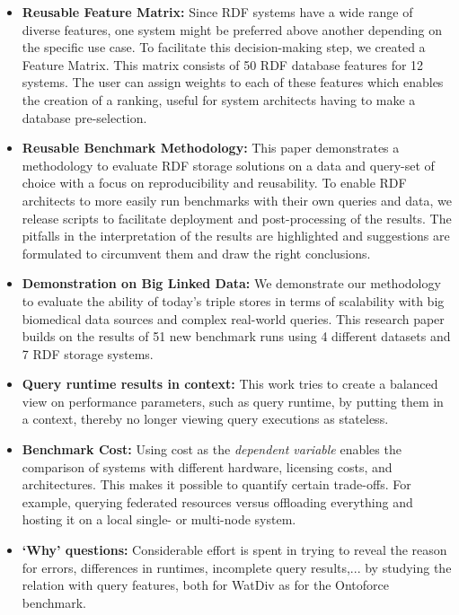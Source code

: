 \begin{itemize}
	\item \textbf{Reusable Feature Matrix:} Since RDF systems have a wide range of diverse features, one system might be preferred above another depending on the specific use case. To facilitate this decision-making step, we created a Feature Matrix. This matrix consists of 50 RDF database features for 12 systems.  The user can assign weights to each of these features which enables the creation of a ranking, useful for system architects having to make a database pre-selection.
	\item \textbf{Reusable Benchmark Methodology:} This paper demonstrates a methodology to evaluate RDF storage solutions on a data and query-set of choice with a focus on reproducibility and reusability. To enable RDF architects to more easily run benchmarks with their own queries and data, we release scripts to facilitate deployment and post-processing of the results. The pitfalls in the interpretation of the results  are highlighted and suggestions are formulated to circumvent them and draw the right conclusions. 
	\item \textbf{Demonstration on Big Linked Data:} We demonstrate our methodology to evaluate the ability of today's triple stores in terms of scalability with big biomedical data sources and complex real-world queries. This research paper builds on the results of 51 new benchmark runs using 4 different datasets and 7 RDF storage systems. 
	\item \textbf{Query runtime results in context:} This work tries to create a balanced view on performance parameters, such as query runtime, by putting them in a context, thereby no longer viewing query executions as stateless. 
	\item \textbf{Benchmark Cost:} Using cost as the \emph{dependent variable} enables the comparison of systems with different hardware, licensing costs, and architectures. This makes it possible to quantify certain trade-offs. For example, querying federated resources versus offloading everything and hosting it on a local single- or multi-node system.
	\item \textbf{`Why' questions:} Considerable effort is spent in trying to reveal the reason for errors, differences in runtimes, incomplete query results,... by studying the relation with query features, both for WatDiv as for the Ontoforce benchmark. 
\end{itemize}
